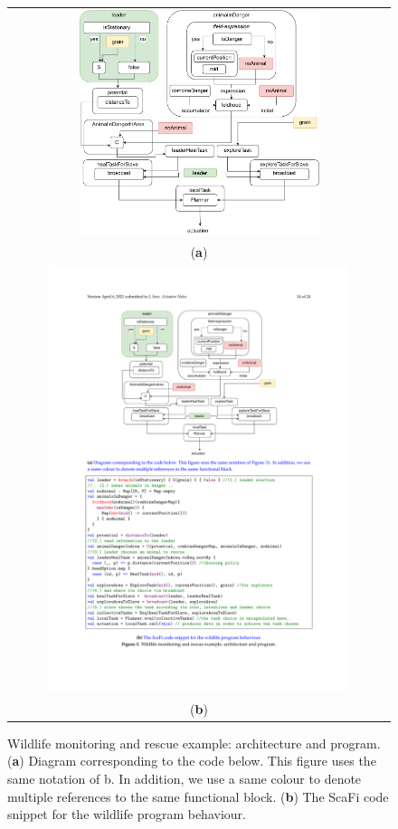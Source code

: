 \documentclass[jsan,article,accept,moreauthors,pdftex]{Definitions/mdpi}
\begin{document}
\nointerlineskip
\begin{figure}[H]
\widefigure
\begin{tabular}{c}
\includegraphics[width=0.65\textwidth]{imgs/wildlife-program-diagram.pdf}\\
({\bf a})\\
\includegraphics[width=0.81\textwidth]{imgs/listing2.pdf}\\
({\bf b})\\
\end{tabular}
\caption{Wildlife monitoring and rescue example: architecture and program. (\textbf{a}) Diagram corresponding to the code below. This figure uses the same notation of b. In addition, we use a same colour to denote multiple references to the same functional block. (\textbf{b}) The ScaFi code snippet for the wildlife program behaviour.}
\label{fig:wildlife-example}
\end{figure}
\end{document}
